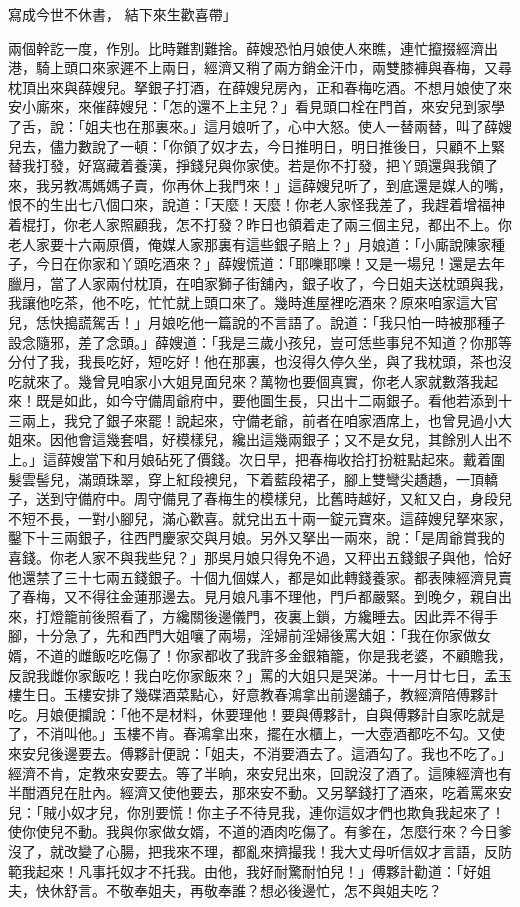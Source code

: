 寫成今世不休書，  結下來生歡喜帶」

兩個幹訖一度，作別。比時難割難捨。薛嫂恐怕月娘使人來瞧，連忙攛掇經濟出港，騎上頭口來家遲不上兩日，經濟又稍了兩方銷金汗巾，兩雙膝褲與春梅，又尋枕頂出來與薛嫂兒。拏銀子打酒，在薛嫂兒房內，正和春梅吃酒。不想月娘使了來安小廝來，來催薛嫂兒：「怎的還不上主兒？」看見頭口栓在門首，來安兒到家學了舌，說：「姐夫也在那裏來。」這月娘听了，心中大怒。使人一替兩替，叫了薛嫂兒去，儘力數說了一頓：「你領了奴才去，今日推明日，明日推後日，只顧不上緊替我打發，好窩藏着養漢，掙錢兒與你家使。若是你不打發，把丫頭還與我領了來，我另教馮媽媽子賣，你再休上我門來！」這薛嫂兒听了，到底還是媒人的嘴，恨不的生出七八個口來，說道：「天麼！天麼！你老人家怪我差了，我趕着增福神着棍打，你老人家照顧我，怎不打發？昨日也領着走了兩三個主兒，都出不上。你老人家要十六兩原價，俺媒人家那裏有這些銀子賠上？」月娘道：「小廝說陳家種子，今日在你家和丫頭吃酒來？」薛嫂慌道：「耶嚛耶嚛！又是一場兒！還是去年臘月，當了人家兩付枕頂，在咱家獅子街舖內，銀子收了，今日姐夫送枕頭與我，我讓他吃茶，他不吃，忙忙就上頭口來了。幾時進屋裡吃酒來？原來咱家這大官兒，恁快搗謊駕舌！」月娘吃他一篇說的不言語了。說道：「我只怕一時被那種子設念隨邪，差了念頭。」薛嫂道：「我是三歲小孩兒，豈可恁些事兒不知道？你那等分付了我，我長吃好，短吃好！他在那裏，也沒得久停久坐，與了我枕頭，茶也沒吃就來了。幾曾見咱家小大姐見面兒來？萬物也要個真實，你老人家就數落我起來！既是如此，如今守備周爺府中，要他圖生長，只出十二兩銀子。看他若添到十三兩上，我兌了銀子來罷！說起來，守備老爺，前者在咱家酒席上，也曾見過小大姐來。因他會這幾套唱，好模樣兒，纔出這幾兩銀子；又不是女兒，其餘別人出不上。」這薛嫂當下和月娘砧死了價錢。次日早，把春梅收拾打扮粧點起來。戴着圍髮雲髻兒，滿頭珠翠，穿上紅段襖兒，下着藍段裙子，腳上雙彎尖趫趫，一頂轎子，送到守備府中。周守備見了春梅生的模樣兒，比舊時越好，又紅又白，身段兒不短不長，一對小腳兒，滿心歡喜。就兌出五十兩一錠元寶來。這薛嫂兒拏來家，鑿下十三兩銀子，往西門慶家交與月娘。另外又拏出一兩來，說：「是周爺賞我的喜錢。你老人家不與我些兒？」那吳月娘只得免不過，又秤出五錢銀子與他，恰好他還禁了三十七兩五錢銀子。十個九個媒人，都是如此轉錢養家。都表陳經濟見賣了春梅，又不得往金蓮那邊去。見月娘凡事不理他，門戶都嚴緊。到晚夕，親自出來，打燈籠前後照看了，方纔關後邊儀門，夜裏上鎖，方纔睡去。因此弄不得手腳，十分急了，先和西門大姐嚷了兩場，淫婦前淫婦後罵大姐：「我在你家做女婿，不道的雌飯吃吃傷了！你家都收了我許多金銀箱籠，你是我老婆，不顧贍我，反說我雌你家飯吃！我白吃你家飯來？」罵的大姐只是哭涕。十一月廿七日，孟玉樓生日。玉樓安排了幾碟酒菜點心，好意教春鴻拿出前邊舖子，教經濟陪傅夥計吃。月娘便攔說：「他不是材料，休要理他！要與傅夥計，自與傅夥計自家吃就是了，不消叫他。」玉樓不肯。春鴻拿出來，擺在水櫃上，一大壺酒都吃不勾。又使來安兒後邊要去。傅夥計便說：「姐夫，不消要酒去了。這酒勾了。我也不吃了。」經濟不肯，定教來安要去。等了半晌，來安兒出來，回說沒了酒了。這陳經濟也有半酣酒兒在肚內。經濟又使他要去，那來安不動。又另拏錢打了酒來，吃着罵來安兒：「賊小奴才兒，你別要慌！你主子不待見我，連你這奴才們也欺負我起來了！使你使兒不動。我與你家做女婿，不道的酒肉吃傷了。有爹在，怎麼行來？今日爹沒了，就改變了心腸，把我來不理，都亂來擠撮我！我大丈母听信奴才言語，反防範我起來！凡事托奴才不托我。由他，我好耐驚耐怕兒！」傅夥計勸道：「好姐夫，快休舒言。不敬奉姐夫，再敬奉誰？想必後邊忙，怎不與姐夫吃？